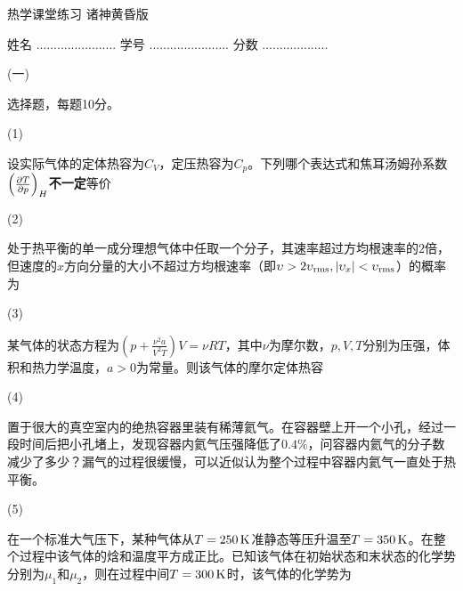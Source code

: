 \documentclass[10pt,CJK]{article}
\begin{document}
\bch
{\large 热学课堂练习 诸神黄昏版}

{\vskip 0.05in}

姓名 ....................... {\hskip 0.5in}    学号 .......................{\hskip 0.5in}  分数 ...................

\bitem

\item[(一)]{选择题，每题10分。

  \bitem

\item[(1)]{设实际气体的定体热容为$C_V$，定压热容为$C_p$。下列哪个表达式和焦耳汤姆孙系数$\left(\frac{\partial T}{\partial p}\right)_{H}${\bf 不一定}等价 \bropt
  
}
  
\item[(2)]{处于热平衡的单一成分理想气体中任取一个分子，其速率超过方均根速率的$2$倍，但速度的$x$方向分量的大小不超过方均根速率（即$\upsilon>2\upsilon_{\rm rms}, |\upsilon_x|<\upsilon_{\rm rms}$）的概率为 \bropt
  

}    
\item[(3)]{某气体的状态方程为$\left(p+\frac{\nu^2 a}{V^2T}\right)V = \nu R T$，其中$\nu$为摩尔数，$p, V, T$分别为压强，体积和热力学温度，$a>0$为常量。则该气体的摩尔定体热容 \bropt
  

}


\item[(4)]{  置于很大的真空室内的绝热容器里装有稀薄氦气。在容器壁上开一个小孔，经过一段时间后把小孔堵上，发现容器内氦气压强降低了$0.4\%$，问容器内氦气的分子数减少了多少？漏气的过程很缓慢，可以近似认为整个过程中容器内氦气一直处于热平衡。 \bropt

}

\item[(5)]{在一个标准大气压下，某种气体从$T=250\,\mathrm{K}$准静态等压升温至$T=350\,\mathrm{K}$。在整个过程中该气体的焓和温度平方成正比。已知该气体在初始状态和末状态的化学势分别为$\mu_1$和$\mu_2$，则在过程中间$T=300\,\mathrm{K}$时，该气体的化学势为 \bropt
  
}
  
  \eitem
}
\end{document}
